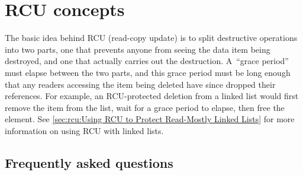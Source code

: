 \section{RCU concepts}
\label{sec:rcu:RCU concepts}

The basic idea behind RCU (read-copy update) is to split destructive
operations into two parts, one that prevents anyone from seeing the data
item being destroyed, and one that actually carries out the destruction.
A~``grace period'' must elapse between the two parts, and this grace period
must be long enough that any readers accessing the item being deleted have
since dropped their references.
For example, an RCU-protected deletion
from a linked list would first remove the item from the list, wait for
a grace period to elapse, then free the element.
See \cref{sec:rcu:Using RCU to Protect Read-Mostly Linked Lists} for more
information on using RCU with linked lists.

\subsection{Frequently asked questions}
\label{sec:rcu:Frequently asked questions}

